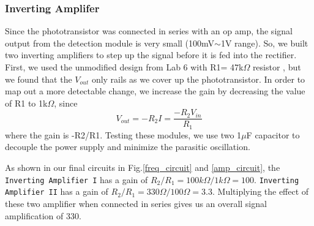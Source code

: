 \documentclass[twocolumn]{article}
\begin{document}
\subsubsection{Inverting Amplifer}
\par Since the phototransistor was connected in series with an op amp, the signal output from the detection module is very small (100mV$\sim$1V range). So, we built two inverting amplifiers to step up the signal  before it is fed into the rectifier. First, we used the unmodified design from Lab 6 with  R1= 47k$\Omega$ resistor , but we found that the $V_{out}$ only rails as we cover up the phototransistor. In order to map out a more detectable change, we increase the gain by decreasing the value of R1 to 1k$\Omega$, since
\begin{equation}
V_{out} = -R_2I = \frac{-R_2V_{in}}{R_1}
\end{equation}
where the gain is -R2/R1. Testing these modules, we use two 1$\mu$F capacitor to decouple the power supply and minimize the parasitic oscillation. 
\par As shown in our final circuits in Fig.\ref{freq_circuit} and \ref{amp_circuit}, the \texttt{Inverting Amplifier I}  has a gain of $R_2/R_1 =  100k\Omega/1k\Omega=100$. \texttt{Inverting Amplifier II} has a gain of $R_2/R_1 =  330\Omega/100\Omega=3.3$. Multiplying the effect of these two amplifier when connected in series gives us an overall signal amplification of 330. 
\end{document}

